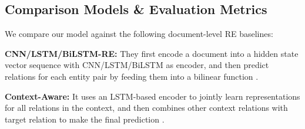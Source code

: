 \documentclass[runningheads]{llncs}
\begin{document}
\begin{table}[t]
	\small
	\caption{Performance of different models on DocRED (\%).}
	\centering
	\label{tab3}
\end{table}

\subsection{Comparison Models \& Evaluation Metrics}
We compare our model against the following  document-level RE baselines:

\textbf{CNN/LSTM/BiLSTM-RE:}  
They first encode a document into a hidden state vector sequence with CNN/LSTM/BiLSTM as encoder, and then predict relations for each entity pair by feeding them into a bilinear function \cite{Yao2019DocREDAL}.

\textbf{Context-Aware:}
It uses an LSTM-based encoder to jointly learn representations for all relations in the context, and then combines other context relations with target relation to make the final prediction \cite{sorokin2017context}.
\end{document}
